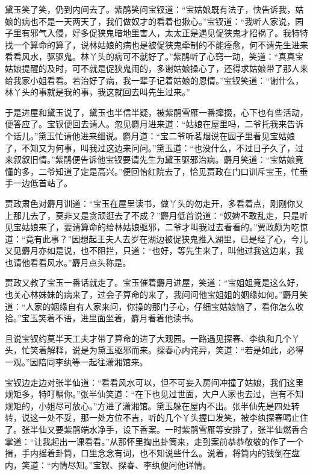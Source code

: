 \documentclass[12pt,oneside]{book}
\begin{document}
黛玉笑了笑，仍到内间去了。紫鹃笑问宝钗道：“宝姑娘既有法子，快告诉我，姑娘的病也不是一天两天了，我们做奴才的看着也揪心。”宝钗道：“我听人家说，园子里有邪气入侵，好多促狭鬼暗地里害人，太太正是遇见促狭鬼才招祸了。我特特找一个算命的算了，说林姑娘的病也是被促狭鬼牵制的不能痊愈，何不请先生进来看看风水，驱驱鬼。林丫头的病可不就好了。”紫鹃听了心窍一动，笑道：“真真宝姑娘提醒的及时，可不就是促狭鬼闹的，多谢姑娘操心了，还得求姑娘带了那人来给我家小姐看看。若治好了病，我一辈子记着姑娘的恩情。”宝钗笑道：“谢什么，林丫头的事就是我的事，我这就回去叫先生过来。”

于是进屋和黛玉说了，黛玉也半信半疑，被紫鹃雪雁一番撺掇，心下也有些活动，便答应了。宝钗便回去请人。忽见麝月进来道：“姑娘在屋里吗，二爷托我来告诉个话儿。”黛玉忙请他进来细说。麝月道：“宝二爷听茗烟说在园子里看见宝姑娘了，不知又为何事，叫我过这边来问问。”黛玉道：“也没什么，不过日子久了，过来叙叙旧情。”紫鹃便告诉他宝钗要请先生为黛玉驱邪治病。麝月笑道：“宝姑娘竟懂的多，二爷知道了定是高兴。”便回怡红院去了，恰见贾政在门口训斥宝玉，忙垂手一边低首站了。

贾政肃色对麝月训道：“宝玉在屋里读书，做丫头的勿走开，多看着点，刚刚你又上那儿去了，莫非又是贪顽逛去了不成？”麝月低首说道：“奴婢不敢乱走，只是听见宝姑娘来了，要请算命的给林姑娘驱邪，二爷才叫我过去看看的。”贾政颇为吃惊道：“竟有此事？”因想起王夫人去岁在湖边被促狭鬼推入湖里，已是经了心，今儿又见麝月亦如是说，也不阻拦，只道：“也好，等先生来了，叫他过我这边来，我也请他看看风水。”麝月点头称是。

贾政又教了宝玉一番话就走了。宝玉催着麝月进屋，笑道：“宝姐姐竟是这么好，也关心林妹妹的病来了，过会子算命的来了，我问问他宝姐姐的姻缘如何。”麝月笑道：“人家的姻缘自有人家来问，你操的那门子心，仔细宝姑娘恼了，看你怎么收拾。”宝玉笑着不语，进里面坐着，麝月看着他读书。

且说宝钗约莫半天工夫才带了算命的进了大观园。一路遇见探春、李纨和几个丫头，忙笑着解释，说是为黛玉驱邪而来。探春心内诧异，笑道：“若是如此，必得一观。”因陪同李纨等一起往潇湘馆来。

宝钗边走边对张半仙道：“看看风水可以，但不可妄入房间冲撞了姑娘，我们这里规矩多，特叮嘱你。”张半仙笑道：“在下也见过世面，大户人家也去过，岂有不知规矩的，小姐尽可放心。”方进了潇湘馆。黛玉躲在屋内不出。张半仙先是四处转转，说这一处不妥，那一处方位不吉，听的几个丫头握口发笑，被李纨探春喝止住了。张半仙又要紫鹃端水净手，设下香案。一时紫鹃雪雁等安排了，张半仙燃香合掌道：“让我起出一课看看。”从那怀里掏出卦筒来，走到案前恭恭敬敬的作了一个揖，手内摇着卦筒，口里念念有词，也不知说些什么。说着，将筒内的钱倒在盘内，笑道：“内情尽知。”宝钗、探春、李纨便问他详情。
\end{document}
